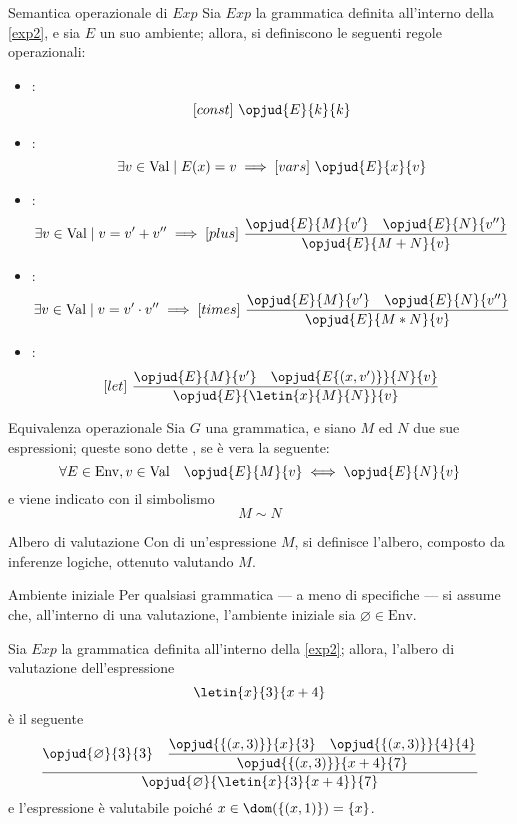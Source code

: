 \documentclass[a4paper, 12pt]{report}
\begin{document}
    \begin{framedprop}[label={exp2 clauses}]{Semantica operazionale di $Exp$}
        Sia $Exp$ la grammatica definita all'interno della \cref{exp2}, e sia $E$ un suo ambiente; allora, si definiscono le seguenti regole operazionali:
        
        \begin{itemize}
            \item {}: $$[const] \ \opjud{E}{k}{k}$$
            \item {}: $$\exists v \in \mathrm{Val} \mid E(x) = v \implies [vars] \ \opjud{E}{x}{v}$$
            \item {}: $$\exists v \in \mathrm{Val} \mid v = v' + v'' \implies [plus] \ \dfrac{\opjud{E}{M}{v'} \quad \opjud{E}{N}{v''}}{\opjud{E}{M + N}{v}}$$
            \item {}: $$\exists v \in \mathrm{Val} \mid v = v' \cdot v'' \implies [times] \ \dfrac{\opjud{E}{M}{v'} \quad \opjud{E}{N}{v''}}{\opjud{E}{M * N}{v}}$$
            \item {}: $$[let] \ \dfrac{\opjud{E}{M}{v'} \quad \opjud{E\{(x, v')\}}{N}{v}}{\opjud{E}{\letin{x}{M}{N}}{v}}$$
        \end{itemize}
    \end{framedprop}

    \begin{frameddefn}{Equivalenza operazionale}
        Sia $G$ una grammatica, e siano $M$ ed $N$ due sue espressioni; queste sono dette , se è vera la seguente: $$\forall E \in \mathrm{Env}, v \in \mathrm{Val} \quad \opjud{E}{M}{v} \iff \opjud{E}{N}{v}$$ e viene indicato con il simbolismo $$M \sim N$$
    \end{frameddefn}

    \begin{frameddefn}{Albero di valutazione}
        Con  di un'espressione $M$, si definisce l'albero, composto da inferenze logiche, ottenuto valutando $M$.
    \end{frameddefn}

    \begin{framedobs}{Ambiente iniziale}
        Per qualsiasi grammatica --- a meno di specifiche --- si assume che, all'interno di una valutazione, l'ambiente iniziale sia $\varnothing \in \mathrm{Env}$.
    \end{framedobs}

    \begin{example}
        Sia $Exp$ la grammatica definita all'interno della \cref{exp2}; allora, l'albero di valutazione dell'espressione $$\letin{x}{3}{x + 4}$$ è il seguente $$\dfrac{\opjud{\varnothing}{3}{3} \quad \dfrac{\opjud{\{(x, 3)\}}{x}{3} \quad \opjud{\{(x,3)\}}{4}{4}}{\opjud{\{(x, 3)\}}{x +4}{7}}}{\opjud{\varnothing}{\letin{x}{3}{x +4}}{7}}$$ e l'espressione è valutabile poiché $x \in \dom(\{(x,1)\}) = \{x\}$.
    \end{example}
\end{document}
